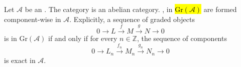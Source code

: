 \begin{proposition} \label{proposition:category_of_graded_objects_in_an_abelian_category_is_abelian}
    Let $\mathcal{A}$ be an . 
    The category  is an abelian category.
    ,  in \hl{$\text{Gr}(\mathcal{A})$} are formed component-wise in $\mathcal{A}$. 
    Explicitly, a sequence of graded objects
    $$0 \to L \xrightarrow{f} M \xrightarrow{g} N \to 0$$
    is  in $\text{Gr}(\mathcal{A})$ if and only if for every $n \in \mathbb{Z}$, the sequence of components
    $$0 \to L_n \xrightarrow{f_n} M_n \xrightarrow{g_n} N_n \to 0$$
    is exact in $\mathcal{A}$.
\end{proposition}